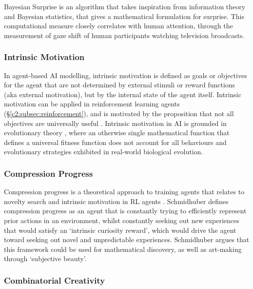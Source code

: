 Bayesian Surprise \citep{itti2005bayesian,itti2009bayesian} is an algorithm that takes inspiration from information theory and Bayesian statistics, that gives a mathematical formulation for surprise. 
This computational measure closely correlates with human attention, through the measurement of gaze shift of human participants watching television broadcasts.

\subsubsection{Intrinsic Motivation}

In agent-based AI modelling, intrinsic motivation is defined as goals or objectives for the agent that are not determined by external stimuli or reward functions (aka external motivation), but by the internal state of the agent itself. 
Intrinsic motivation can be applied in reinforcement learning agents \citep{chentanez2004intrinsically} (\S \ref{c2:subsec:reinforcement}), and is motivated by the proposition that not all objectives are universally useful \citep{barto2013intrinsic}.
Intrinsic motivation in AI is grounded in evolutionary theory \citep{singh2010intrinsically}, where an otherwise single mathematical function that defines a universal fitness function does not account for all behaviours and evolutionary strategies exhibited in real-world biological evolution.

\subsubsection{Compression Progress}

Compression progress \citep{schmidhuber2008driven} is a theoretical approach to training agents that relates to novelty search \citep{lehman2008exploiting} and intrinsic motivation in RL agents \citep{chentanez2004intrinsically}.
Schmidhuber defines compression progress as an agent that is constantly trying to efficiently represent prior actions in an environment, whilst constantly seeking out new experiences that would satisfy an `intrinsic curiosity reward', which would drive the agent toward seeking out novel and unpredictable experiences.
Schmidhuber argues that this framework could be used for mathematical discovery, as well as art-making through `subjective beauty'.

\subsubsection{Combinatorial Creativity}

